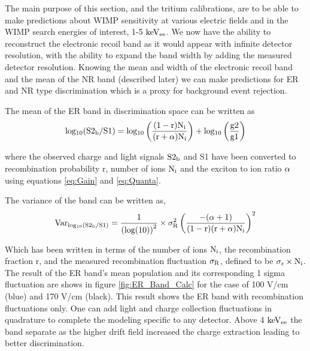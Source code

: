 The main purpose of this section, and the tritium calibrations, are to be able to make predictions about WIMP sensitivity at various electric fields and in the WIMP search energies of interest, 1-5 $\rm keV_{ee}$. We now have the ability to reconstruct the electronic recoil band as it would appear with infinite detector resolution, with the ability to expand the band width by adding the measured detector resolution. Knowing the mean and width of the electronic recoil band and the mean of the NR band (described later) we can make predictions for ER and NR type discrimination which is a proxy for background event rejection.  

The mean of the ER band in discrimination space can be written as
\begin{equation}
\rm log_{10}(S2_b/S1) = log_{10} \left(\frac{(1-r)N_i}{(r+\alpha)N_i}\right) + log_{10}\left(\frac{g2}{g1}\right)
\label{eq:Band_Mean}
\end{equation}

\noindent where the observed charge and light signals $\rm S2_b$ and S1 have been converted to recombination probability r,  number of ions $\rm N_i$ and the exciton to ion ratio $\rm \alpha$ using equations \ref{eq:Gain} and \ref{eq:Quanta}.

The variance of the band can be written as,
\begin{equation}
\rm Var_{log_{10}(S2_b/S1)} = \frac{1}{\left(log(10)\right)^2} \times \sigma_R^2 \left( \frac{ - (\alpha+1) }{(1-r)(r+\alpha)N_i} \right)^2
\label{eq:Band_Var}
\end{equation}

\noindent Which has been written in terms of the number of ions $\rm N_i$, the recombination fraction r, and the measured recombination fluctuation $\rm \sigma_R$, defined to be $\rm \sigma_r\times N_i$. The result of the ER band's mean population and its corresponding 1 sigma fluctuation are shows in figure \ref{fig:ER_Band_Calc} for the case of 100 V/cm (blue) and 170 V/cm (black). This result shows the ER band with recombination fluctuations only. One can add light and charge collection fluctuations in quadrature to complete the modeling specific to any detector. Above 4 $\rm keV_{ee}$ the band separate as the higher drift field increased the charge extraction leading to better discrimination.

